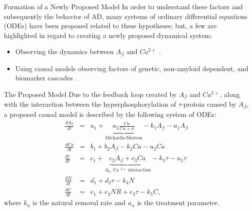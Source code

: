 \documentclass[9pt, dvipsnames,compress,aspectratio=169]{beamer}
\begin{document}
\begin{frame}{Formation of a Newly Proposed Model}
    In order to understand these factors and subsequently the behavior of AD, many systems of ordinary differential equations (ODEs) have been proposed related to these hypotheses; but, a few are highlighted in regard to creating a newly proposed dynamical system:
    \begin{itemize}
        \item Observing the dynamics between $A_\beta$ and $Ca ^{2+}$ \cite{pal2025nonequilibrium}.
        \item Using causal models observing factors of genetic, non-amyloid dependent, and biomarker cascades \cite{petrella2019computational}.
    \end{itemize}
\end{frame}

\begin{frame}{The Proposed Model}
    Due to the feedback loop created by $A_\beta$ and $Ca ^{2+}$, along with the interaction between the hyperphosphorylation of $\tau$-protein caused by $A_\beta$, a proposed causal model is described by the following system of ODEs:
    \begin{eqnarray*}
        \frac{dA _{\beta}}{dt}&=&a _{1}+\underbrace{a _{2}\frac{Ca}{Ca+\sigma}}_{\text{Michaelis-Menton}}- k_1 A _{\beta} - u_1 A_\beta\\
        \frac{dCa}{dt}&=& b _{1}+b _{2}A _{\beta}- k_2 Ca - u_2 Ca\\
        \frac{d \tau}{dt}&=&c _{1}+\underbrace{c _{2}A _{\beta}+c _{3}Ca}_{\text{$A_\beta$, Ca $^{2+}$ interaction}}- k_3 \tau - u_3 \tau\\
        \frac{dN}{dt}&=&d _{1}+d _{2}\tau-k _{4}N\\
        \frac{dC}{dt}&=&e _{1}+e _{2}NR + e _{3}\tau - k_5 C,
    \end{eqnarray*}
    where $k_n$ is the natural removal rate and $u_n$ is the treatment parameter.
\end{frame}
\end{document}
